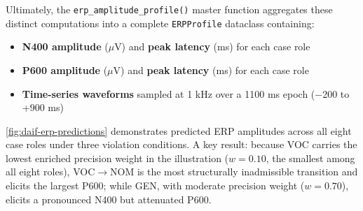 \documentclass[
]{article}
\providecommand{\tightlist}{%
  \setlength{\itemsep}{0pt}\setlength{\parskip}{0pt}}
\begin{document}
Ultimately, the \texttt{erp\_amplitude\_profile()} master function
aggregates these distinct computations into a complete
\texttt{ERPProfile} dataclass containing:

\begin{itemize}
\tightlist
\item
  \textbf{N400 amplitude} (\texorpdfstring{\ensuremath{\mu}}{mu}V) and \textbf{peak latency} (ms) for each
  case role
\item
  \textbf{P600 amplitude} (\texorpdfstring{\ensuremath{\mu}}{mu}V) and \textbf{peak latency} (ms) for each
  case role
\item
  \textbf{Time-series waveforms} sampled at 1 kHz over a 1100 ms epoch
  (\texorpdfstring{\ensuremath{-}}{-}200 to +900 ms)
\end{itemize}

\autoref{fig:daif-erp-predictions} demonstrates predicted ERP amplitudes
across all eight case roles under three violation conditions. A key
result: because VOC carries the lowest enriched precision weight in the
illustration (\(w = 0.10\), the smallest among all eight roles), VOC\texorpdfstring{\ensuremath{\to}}{->}NOM
is the most structurally inadmissible transition and elicits the largest
P600; while GEN, with moderate precision weight (\(w = 0.70\)), elicits
a pronounced N400 but attenuated P600.
\end{document}
